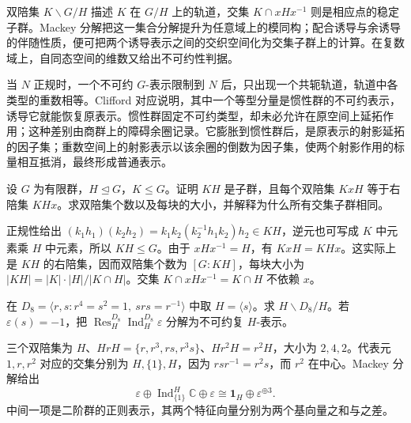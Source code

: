 \begin{chaptersummary}
	双陪集 \(K\backslash G/H\) 描述 \(K\) 在 \(G/H\) 上的轨道，交集 \(K\cap xHx^{-1}\) 则是相应点的稳定子群。Mackey 分解把这一集合分解提升为任意域上的模同构；配合诱导与余诱导的伴随性质，便可把两个诱导表示之间的交织空间化为交集子群上的计算。在复数域上，自同态空间的维数又给出不可约性判据。

	\ProseParagraphBreak

	当 \(N\) 正规时，一个不可约 \(G\)-表示限制到 \(N\) 后，只出现一个共轭轨道，轨道中各类型的重数相等。Clifford 对应说明，其中一个等型分量是惯性群的不可约表示，诱导它就能恢复原表示。惯性群固定不可约类型，却未必允许在原空间上延拓作用；这种差别由商群上的障碍余圈记录。它膨胀到惯性群后，是原表示的射影延拓的因子集；重数空间上的射影表示以该余圈的倒数为因子集，使两个射影作用的标量相互抵消，最终形成普通表示。
\end{chaptersummary}

\BookExercises

\begin{exercise}\label{b5:ex:04-normal-double-cosets}
	设 \(G\) 为有限群，\(H\trianglelefteq G\)，\(K\leq G\)。证明 \(KH\) 是子群，且每个双陪集 \(KxH\) 等于右陪集 \(KHx\)。求双陪集个数以及每块的大小，并解释为什么所有交集子群相同。
\end{exercise}
\begin{solution}
	正规性给出 \((k_1h_1)(k_2h_2)=k_1k_2(k_2^{-1}h_1k_2)h_2\in KH\)，逆元也可写成 \(K\) 中元素乘 \(H\) 中元素，所以 \(KH\leq G\)。由于 \(xHx^{-1}=H\)，有 \(KxH=KHx\)。这实际上是 \(KH\) 的右陪集，因而双陪集个数为 \([G:KH]\)，每块大小为 \(|KH|=|K|\cdot|H|/|K\cap H|\)。交集 \(K\cap xHx^{-1}=K\cap H\) 不依赖 \(x\)。
\end{solution}

\begin{exercise}\label{b5:ex:04-dihedral-double-cosets}
	在 \(D_8=\langle r,s:r^4=s^2=1,\ srs=r^{-1}\rangle\) 中取 \(H=\langle s\rangle\)。求 \(H\backslash D_8/H\)。若 \(\varepsilon(s)=-1\)，把 \(\operatorname{Res}_H^{D_8}\operatorname{Ind}_H^{D_8}\varepsilon\) 分解为不可约复 \(H\)-表示。
\end{exercise}
\begin{solution}
	三个双陪集为 \(H\)、\(HrH=\{r,r^3,rs,r^3s\}\)、\(Hr^2H=r^2H\)，大小为 \(2,4,2\)。代表元 \(1,r,r^2\) 对应的交集分别为 \(H,\{1\},H\)，因为 \(rsr^{-1}=r^2s\)，而 \(r^2\) 在中心。Mackey 分解给出
	\[
		\varepsilon\oplus\operatorname{Ind}_{\{1\}}^H\mathbb C\oplus\varepsilon \cong\mathbf1_H\oplus\varepsilon^{\oplus3}.
	\]
	中间一项是二阶群的正则表示，其两个特征向量分别为两个基向量之和与之差。
\end{solution}

